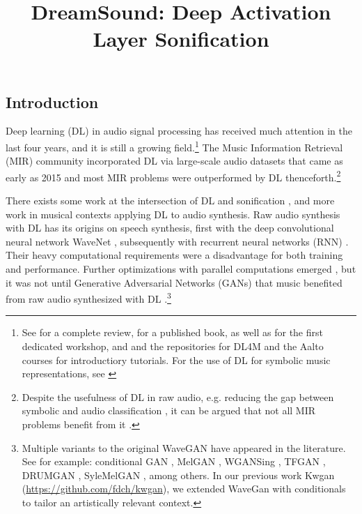 \documentclass[a4paper,10pt,oneside]{article}
\title{DreamSound: Deep Activation Layer Sonification}
\begin{document}
\ninept
\maketitle

\begin{sloppy}
\begin{abstract}

\end{abstract}

\section{Introduction}
\label{sec:intro}

Deep learning (DL) in audio signal processing has received much attention in the last four years, and it is still a growing field.\footnote{See \cite{2019Purwins} for a complete review, \cite{Briot2017} for a published book, as well as\cite{herremans2017proceedings} for the first dedicated workshop, and \cite{choi2017tutorial} and the repositories for DL4M \cite{Bayle2017} and the Aalto courses \cite{Koray2018} for introductiory tutorials. For the use of DL for symbolic music representations, see \cite{yang2017midinet, Briot2018AnET, rachel_manzelli_2018_1492375, hao_wen_dong_2018_1492377, mittal2021symbolic, MuseGanPapers}}  The Music Information Retrieval (MIR) community incorporated DL via large-scale audio datasets that came as early as 2015 \cite{2015piczak,2017audioset,engel2017neural} and most MIR problems were outperformed by DL thenceforth.\footnote{Despite the usefulness of DL in raw audio, e.g. reducing the gap between symbolic and audio classification \cite{sergio_oramas_2017_1417427}, it can be argued that not all MIR problems benefit from it \cite{harsh_verma_2019_3527866}.} 

There exists some work at the intersection of DL and sonification \cite{Winters2019}, and more work in musical contexts applying DL to audio synthesis. Raw audio synthesis with DL has its origins on speech synthesis, first with the deep convolutional neural network WaveNet \cite{oord2016wavenet}, subsequently with recurrent neural networks (RNN) \cite{mehri2017samplernn, kalchbrenner2018efficient}. Their heavy computational requirements were a disadvantage for both training and performance. Further optimizations with parallel computations emerged \cite{oord2017parallel,lamtharn_hantrakul_2019_3527860,yamamoto2020parallel,song2021improved}, but it was not until Generative Adversarial Networks (GANs) that music benefited from raw audio synthesized with DL \cite{Bollepalli_2017, 2017Kaneko, pascual2017segan, donahue2018adversarial, 2019waveglow, tian2020tfgan, Liu_2020}.\footnote{Multiple variants to the original WaveGAN have appeared in the literature. See for example: conditional GAN \cite{2018Lee}, MelGAN \cite{NEURIPS2019_6804c9bc, jang2021universal}, WGANSing \cite{Chandna_2019}, TFGAN \cite{tian2020tfgan}, DRUMGAN \cite{javier_nistal_2020_4245504}, SyleMelGAN \cite{mustafa2021stylemelgan}, among others. In our previous work Kwgan (\url{https://github.com/fdch/kwgan}), we  extended WaveGan with conditionals to tailor an artistically relevant context.}


\end{sloppy}
\end{document}
